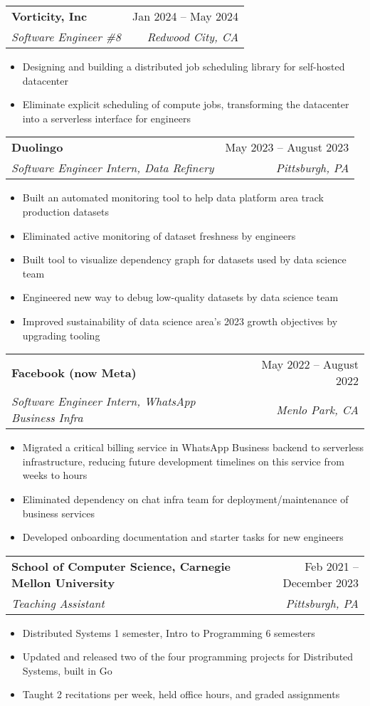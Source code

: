\documentclass[letterpaper,11pt]{article}
\makeatletter
\newcommand{\resumeItem}[1]{
  \item\small{
    {#1 \vspace{-2pt}}
  }
}
\newcommand{\resumeSubheading}[4]{
  \vspace{-2pt}\item
    \begin{tabular*}{0.97\textwidth}[t]{l@{\extracolsep{\fill}}r}
      \textbf{#1} & #2 \\
      \textit{\small#3} & \textit{\small #4} \\
    \end{tabular*}\vspace{-7pt}
}
\newcommand{\resumeItemListStart}{\begin{itemize}}
\newcommand{\resumeItemListEnd}{\end{itemize}\vspace{-5pt}}
\makeatother
\begin{document}
    \resumeSubheading
      {Vorticity, Inc}{Jan 2024 -- May 2024}
      {Software Engineer \#8}{Redwood City, CA}
      \resumeItemListStart
        \resumeItem{Designing and building a distributed job scheduling library for self-hosted datacenter}
        \resumeItem{Eliminate explicit scheduling of compute jobs, transforming the datacenter into a serverless interface for engineers}
      \resumeItemListEnd
    \resumeSubheading
      {Duolingo}{May 2023 -- August 2023}
      {Software Engineer Intern, Data Refinery}{Pittsburgh, PA}
      \resumeItemListStart
      \resumeItem{Built an automated monitoring tool to help data platform area track production datasets}
      \resumeItem{Eliminated active monitoring of dataset freshness by engineers}
      \resumeItem{Built tool to visualize dependency graph for datasets used by data science team}
      \resumeItem{Engineered new way to debug low-quality datasets by data science team}
      \resumeItem{Improved sustainability of data science area's 2023 growth objectives by upgrading tooling}
      \resumeItemListEnd
    \resumeSubheading
        {Facebook (now Meta)}{May 2022 -- August 2022}
        {Software Engineer Intern, WhatsApp Business Infra}{Menlo Park, CA}
        \resumeItemListStart
          \resumeItem{Migrated a critical billing service in WhatsApp Business backend to serverless infrastructure, reducing future development timelines on this service from weeks to hours}
          \resumeItem{Eliminated dependency on chat infra team for deployment/maintenance of business services}
          \resumeItem{Developed onboarding documentation and starter tasks for new engineers}
        \resumeItemListEnd
    \resumeSubheading
      {School of Computer Science, Carnegie Mellon University}{Feb 2021 -- December 2023}
      {Teaching Assistant}{Pittsburgh, PA}
        \resumeItemListStart
          \resumeItem{Distributed Systems 1 semester, Intro to Programming 6 semesters}
          \resumeItem{Updated and released two of the four programming projects for Distributed Systems, built in Go}
          \resumeItem{Taught 2 recitations per week, held office hours, and graded assignments}
        \resumeItemListEnd

      
\end{document}
